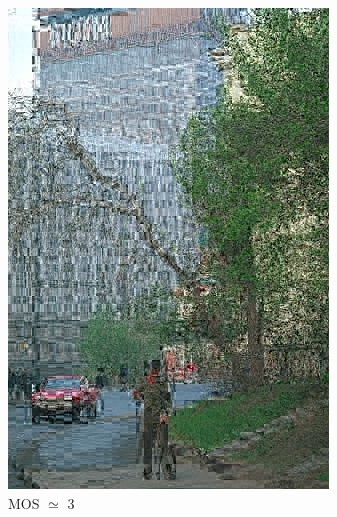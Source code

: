 \documentclass{article}
\begin{document}
\begin{figure}[ht]
\begin{subfigure}{2.9cm}
  \includegraphics[width=0.9\linewidth]{figures/ac_xor_luminance_76_274007}
  \caption{MOS $\simeq$ 3}
  \label{fig:sub1}
\end{subfigure}%
\begin{subfigure}{2.9cm}
  \centering

\end{subfigure}
\end{figure}
\end{document}
